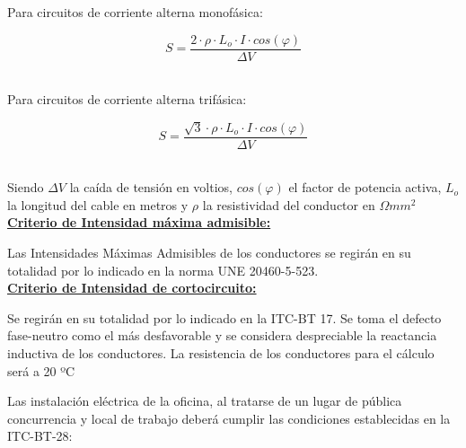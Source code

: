 Para circuitos de corriente alterna monofásica:\

$$ S=\frac{2\cdot \rho \cdot L_o	\cdot I\cdot cos(\varphi)}{\Delta V}$$\

Para circuitos de corriente alterna trifásica:\

$$ S=\frac{\sqrt{3} \cdot \rho \cdot L_o \cdot I\cdot cos(\varphi)}{\Delta V}$$\

Siendo $\Delta V$ la caída de tensión en voltios, $cos(\varphi)$ el factor de potencia activa, $L_o$ la longitud del cable en metros y $\rho$ la resistividad del conductor en $\Omega mm^2$\\


\underline{\bfseries Criterio de Intensidad máxima admisible:}\

Las Intensidades Máximas Admisibles de los conductores se regirán en su totalidad por lo indicado en la norma UNE 20460-5-523.\\

\underline{\bfseries Criterio de Intensidad de cortocircuito:}\

Se regirán en su totalidad por lo indicado en la ITC-BT 17. Se toma el defecto fase-neutro como el más desfavorable y se considera despreciable la reactancia inductiva de los conductores. La resistencia de los conductores para el cálculo será a 20 ºC\\
\pagebreak

Las instalación eléctrica de la oficina, al tratarse de un lugar de pública concurrencia y local de trabajo deberá cumplir las condiciones establecidas en la ITC-BT-28: \\

